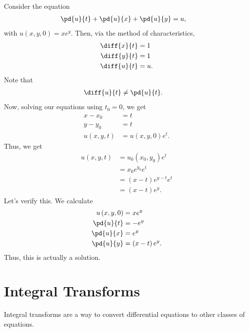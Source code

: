 \documentclass[10pt]{mypackage}
\begin{document}
\begin{example}
  Consider the equation
  \begin{align*}
    \pd{u}{t} + \pd{u}{x} + \pd{u}{y} &= u,
  \end{align*}
  with $u\left( x,y,0 \right) = xe^{y}$. Then, via the method of characteristics,
  \begin{align*}
    \diff{x}{t} &= 1\\
    \diff{y}{t} &= 1\\
    \diff{u}{t} &= u.
  \end{align*}
  {\color{red}Note that
  \begin{align*}
    \diff{u}{t} &\neq \pd{u}{t}.
  \end{align*}}
  Now, solving our equations using $t_0 = 0$, we get
  \begin{align*}
    x-x_0 &= t\\
    y-y_0 &= t\\
    u\left( x,y,t \right) &= u\left( x,y,0 \right)e^{t}.
  \end{align*}
  Thus, we get
  \begin{align*}
    u\left( x,y,t \right) &= u_0\left( x_0,y_0 \right)e^{t}\\
                          &= x_0e^{y_0}e^{t}\\
                          &= \left( x-t \right)e^{y-t}e^{t}\\
                          &= \left( x-t \right)e^{y}.
  \end{align*}
  Let's verify this. We calculate
  \begin{align*}
    u\left( x,y,0 \right) &= xe^{y}\\
    \pd{u}{t} &= -e^{y}\\
    \pd{u}{x} &= e^{y}\\
    \pd{u}{y} &= \left( x-t \right)e^{y}.
  \end{align*}
  Thus, this is actually a solution.
\end{example}
\section{Integral Transforms}%
Integral transforms are a way to convert differential equations to other classes of equations.\newline
\end{document}
